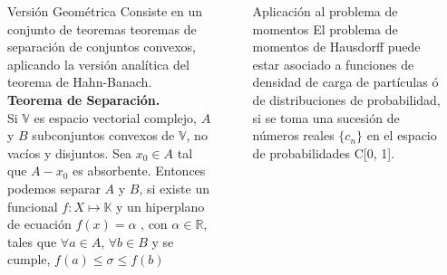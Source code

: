 \documentclass[24pt,final]{beamer}
\newlength{\sepwid}
\newlength{\onecolwid}
\newlength{\twocolwid}
\begin{document}
\begin{frame}[t]
\begin{columns}[t]
\begin{column}{\twocolwid}
\begin{columns}[t,totalwidth=\twocolwid]
\begin{column}{\onecolwid}
\end{column} %

\begin{column}{\onecolwid} %


\begin{block}{Versión Geométrica}
Consiste en un conjunto de teoremas teoremas de separación de conjuntos convexos, aplicando la versión analítica del teorema de Hahn-Banach.\\[0.5cm]

 \textbf{Teorema de Separación.} \\
 Si $\mathbb{V}$ es espacio vectorial complejo, $A$ y $B$ subconjuntos convexos de $\mathbb{V}$, no vacíos y disjuntos. Sea $ x_0 \in A$ tal que $ A-x_0 $ es absorbente. Entonces podemos separar $A$ y $B$, si existe un funcional $f: X \longmapsto \mathbb{K}$ y  un hiperplano de ecuación $f(x) =\alpha $ , con $\alpha \in \mathbb{R} $,  tales que $\forall a \in A$, $\forall b \in B$ y se cumple,
$f(a) \leq \sigma \leq f(b)$
\end{block}


\end{column} %

\end{columns} %

\end{column} %

\begin{column}{\sepwid}\end{column} %

\begin{column}{\onecolwid} %


\begin{block}{Aplicación al problema de momentos}
El problema de momentos de Hausdorff puede estar asociado a funciones de densidad de carga de partículas ó de distribuciones de probabilidad, si se toma una sucesión de números reales $\{c_n\}$ en el espacio de probabilidades C[0, 1]. \\[0.5cm]


\end{block}
\end{column}
\end{columns}
\end{frame}
\end{document}
